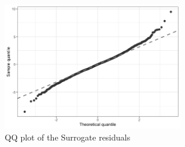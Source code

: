 \documentclass[wcp]{jmlr}%
\begin{document}
\begin{figure}
	\centering
	\includegraphics[width=0.7\textwidth]{qqplot.png}
	\caption{QQ plot of the Surrogate residuals}
	\label{fig:qqplot}
\end{figure}



%
\end{document}
